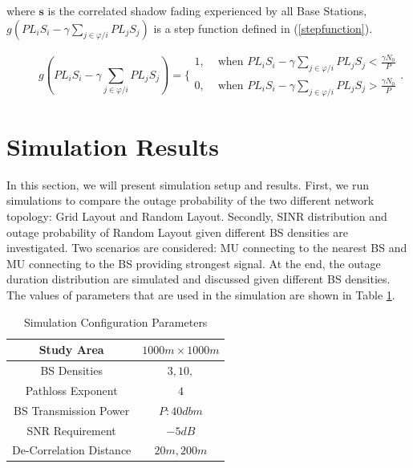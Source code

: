 where $\mathbf{s}$ is the correlated shadow fading experienced by all Base Stations, $g(PL_{i}S_{i} - \gamma\sum_{j\in\varphi/i}PL_{j}S_{j})$ is a step function defined in (\ref{stepfunction}).
\begin{figure}[!t]
\normalsize

\begin{equation}
\label{stepfunction}
g(PL_{i}S_{i} - \gamma\sum_{j\in\varphi/i}PL_{j}S_{j}) = \{\begin{array}{cc}
               1, &  \text{  when }PL_{i}S_{i} - \gamma\sum_{j\in\varphi/i}PL_{j}S_{j} <\frac{\gamma N_{0}}{P}\\
               0, & \text{  when }PL_{i}S_{i} - \gamma\sum_{j\in\varphi/i}PL_{j}S_{j} >\frac{\gamma N_{0}}{P}
             \end{array}.
\end{equation}
\hrulefill
\vspace*{4pt}
\end{figure}

\section{Simulation Results}
\par In this section, we will present simulation setup and results. First, we run simulations to compare the outage probability of the two different network topology: Grid Layout and Random Layout. Secondly, SINR distribution and outage probability of Random Layout given different BS densities are investigated. Two scenarios are considered: MU connecting to the nearest BS and MU connecting to the BS providing strongest signal. At the end, the outage duration distribution are simulated and discussed given different BS densities. The values of parameters that are used in the simulation are shown in Table \ref{SystemConfig2}. 
\begin{table}
\centering
\caption{\label{SystemConfig2}Simulation Configuration Parameters}

\begin{tabular}{|c|c|}

\hline
Study Area & $1000m\times 1000m$\\
\hline
BS Densities & $3, 10,$\\
\hline
Pathloss Exponent & $4$\\
\hline
BS Transmission Power & $P: 40dbm$\\
\hline
SNR Requirement & $-5dB$\\
\hline
De-Correlation Distance & $20m, 200m$\\
\hline
\end{tabular}

\end{table}

